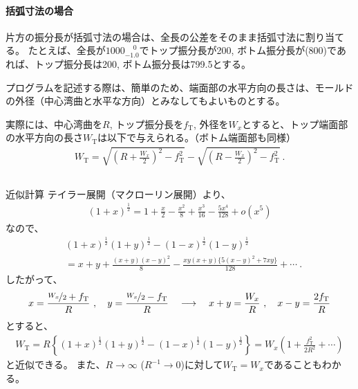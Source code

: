 \paragraph*{括弧寸法の場合}\noindent
片方の振分長が括弧寸法の場合は、全長の公差をそのまま括弧寸法に割り当てる。
たとえば、全長が$1000^{\phantom +0}_{-1.0}$でトップ振分長が200, ボトム振分長が(800)であれば、トップ振分長は200, ボトム振分長は799.5とする。




プログラムを記述する際は、簡単のため、端面部の水平方向の長さは、モールドの外径（中心湾曲と水平な方向）とみなしてもよいものとする。

実際には、中心湾曲を$R$, トップ振分長を$f_\mathrm T$, 外径を$W_x$とすると、トップ端面部の水平方向の長さ$W_\mathrm T$は以下で与えられる。（ボトム端面部も同様）
\begin{align*}
  W_\mathrm T
  = \sqrt{\left(R+\frac{W_x}2\right)^{\!2}-f_\mathrm T^2}
    -\sqrt{\left(R-\frac{W_x}2\right)^{\!2}-f_\mathrm T^2}\ .
\end{align*}
\begin{Column}{近似計算}
テイラー展開（マクローリン展開）より、
\begin{align*}
  (1+x)^\frac12 = 1+\frac x2-\frac{x^2}8+\frac{x^3}{16}-\frac{5x^4}{128}+o\!\left(x^5\right)
\end{align*}
なので、
\begin{align*}
  & (1+x)^\frac12(1+y)^\frac12-(1-x)^\frac12(1-y)^\frac12\\
  &= x+y+\frac{(x+y)(x-y)^2}8-\frac{xy(x+y)\big\{5(x-y)^2+7xy\big\}}{128}+\cdots\ .
\end{align*}
したがって、
\begin{align*}
  x = \frac{\nicefrac{W_x}2+f_\mathrm T}R\ ,\quad y = \frac{\nicefrac{W_x}2-f_\mathrm T}R\quad
  \longrightarrow \quad
  x+y = \frac{W_x}R\ , \quad x-y = \frac{2f_\mathrm T}R
\end{align*}
とすると、
\begin{align*}
  W_\mathrm T
  = R\left\{(1+x)^\frac12(1+y)^\frac12-(1-x)^\frac12(1-y)^\frac12\right\}
  = W_x\!\left(1+\frac{f_\mathrm T^2}{2R^2}+\cdots\right)
\end{align*}
と近似できる。
また、$R\to\infty$ ($R^{-1}\to0$)に対して$W_\mathrm T = W_x$であることもわかる。
\end{Column}


